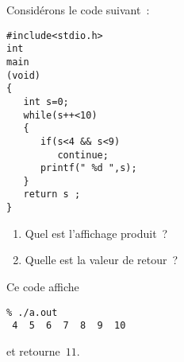 Consid\'erons le code suivant~:
\begin{verbatim}
#include<stdio.h>
int
main
(void)
{
   int s=0;
   while(s++<10)
   {
      if(s<4 && s<9)
         continue;
      printf(" %d ",s);
   }
   return s ;
}
\end{verbatim}
\begin{enumerate}
\item Quel est l'affichage produit~?
\item Quelle est la valeur de retour~?
\end{enumerate}
\ifcorrection
\begin{correction}
Ce code affiche
\begin{verbatim}
% ./a.out
 4  5  6  7  8  9  10
\end{verbatim}
et retourne~$11$.
\end{correction}
\fi
